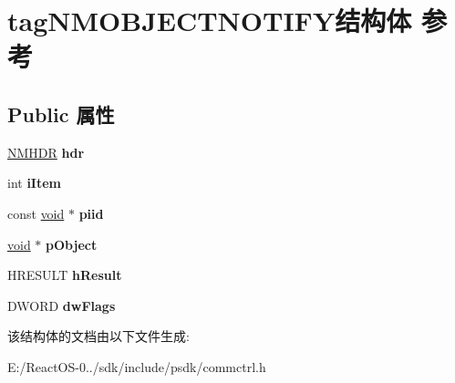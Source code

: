 \hypertarget{structtag_n_m_o_b_j_e_c_t_n_o_t_i_f_y}{}\section{tag\+N\+M\+O\+B\+J\+E\+C\+T\+N\+O\+T\+I\+F\+Y结构体 参考}
\label{structtag_n_m_o_b_j_e_c_t_n_o_t_i_f_y}
\subsection*{Public 属性}
\begin{DoxyCompactItemize}
\item 
\mbox{\label{structtag_n_m_o_b_j_e_c_t_n_o_t_i_f_y_a33a49c91022398897ce917af95b08ce8}} 
\hyperlink{structtag_n_m_h_d_r}{N\+M\+H\+DR} {\bfseries hdr}
\item 
\mbox{\label{structtag_n_m_o_b_j_e_c_t_n_o_t_i_f_y_abd9ac050d1f09fa2ea85daa9195df604}} 
int {\bfseries i\+Item}
\item 
\mbox{\label{structtag_n_m_o_b_j_e_c_t_n_o_t_i_f_y_a04123f6c6615d858f3d42f53fb92df43}} 
const \hyperlink{interfacevoid}{void} $\ast$ {\bfseries piid}
\item 
\mbox{\label{structtag_n_m_o_b_j_e_c_t_n_o_t_i_f_y_a53b83fa88a46d5246b8bb1041c46c403}} 
\hyperlink{interfacevoid}{void} $\ast$ {\bfseries p\+Object}
\item 
\mbox{\label{structtag_n_m_o_b_j_e_c_t_n_o_t_i_f_y_a3694d16838b5a005664bf0345f2ce557}} 
H\+R\+E\+S\+U\+LT {\bfseries h\+Result}
\item 
\mbox{\label{structtag_n_m_o_b_j_e_c_t_n_o_t_i_f_y_aeb4ea569a53000604870cf41b3e96d4f}} 
D\+W\+O\+RD {\bfseries dw\+Flags}
\end{DoxyCompactItemize}


该结构体的文档由以下文件生成\+:\begin{DoxyCompactItemize}
\item 
E\+:/\+React\+O\+S-\/0../sdk/include/psdk/commctrl.\+h\end{DoxyCompactItemize}
